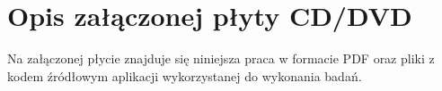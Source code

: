 \chapter{Opis załączonej płyty CD/DVD}
Na załączonej płycie znajduje się niniejsza praca w formacie PDF oraz pliki z kodem źródłowym
aplikacji wykorzystanej do wykonania badań. 